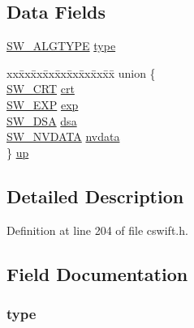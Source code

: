 \subsection*{Data Fields}
\begin{DoxyCompactItemize}
\item 
\hyperlink{cswift_8h_a502f2b57e4e3f4539da21d8414489135}{S\+W\+\_\+\+A\+L\+G\+T\+Y\+PE} \hyperlink{struct___s_w___p_a_r_a_m_a8e0814ac24b2e5cb7577d1666b40e069}{type}
\item 
\begin{tabbing}
xx\=xx\=xx\=xx\=xx\=xx\=xx\=xx\=xx\=\kill
union \{\\
\>\hyperlink{cswift_8h_a9bd0b0b8a8293798c79bc28fda5e72f4}{SW\_CRT} \hyperlink{struct___s_w___p_a_r_a_m_a82332a4ff32d329f5f81ddc5788c27f1}{crt}\\
\>\hyperlink{cswift_8h_a243eeee9f031e5d9e6a5ff390746af8d}{SW\_EXP} \hyperlink{struct___s_w___p_a_r_a_m_a8067fc15e275e21bc42fc5fab37b0743}{exp}\\
\>\hyperlink{cswift_8h_ac62baefcaf6b5deaa1983ea87b4910a6}{SW\_DSA} \hyperlink{struct___s_w___p_a_r_a_m_ae8c89dc9cb67406d97d4deecec15f445}{dsa}\\
\>\hyperlink{cswift_8h_aa9eecb9c0ee28e80f5f0c9b0cbdd620f}{SW\_NVDATA} \hyperlink{struct___s_w___p_a_r_a_m_a1b2c8b595a77684732b8cc969bb46253}{nvdata}\\
\} \hyperlink{struct___s_w___p_a_r_a_m_ac589df1364a0aef9cc3236c8e9c1ec68}{up}\\

\end{tabbing}\end{DoxyCompactItemize}


\subsection{Detailed Description}


Definition at line 204 of file cswift.\+h.



\subsection{Field Documentation}
\subsubsection[{\texorpdfstring{type}{type}}]{ type}\hypertarget{struct___s_w___p_a_r_a_m_a8e0814ac24b2e5cb7577d1666b40e069}{}\label{struct___s_w___p_a_r_a_m_a8e0814ac24b2e5cb7577d1666b40e069}


